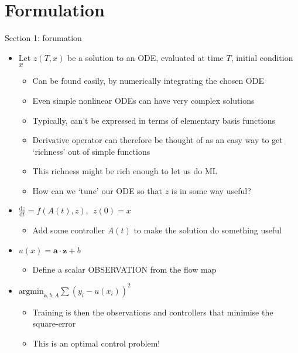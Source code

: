 \documentclass[presentation]{beamer}
\begin{document}
\section{Formulation}
\label{sec:orgaaa8066}
\begin{frame}[label={sec:orgf31cd99},plain]{Section 1: forumation}
\begin{itemize}
\item Let \(z(T,x)\) be a solution to an ODE, evaluated at time \(T\), initial condition \(x\)
\begin{itemize}
\item Can be found easily, by numerically integrating the chosen ODE
\item Even simple nonlinear ODEs can have very complex solutions
\item Typically, can't be expressed in terms of elementary basis functions
\item Derivative operator can therefore be thought of as an easy way to get `richness' out of simple functions
\item This richness might be rich enough to let us do ML
\item \alert{How can we `tune' our ODE so that \(z\) is in some way useful?}
\end{itemize}
\item \(\frac{\mathrm{d}z}{\mathrm{d}t} = f(A(t), z),~~z(0)=x\)
\begin{itemize}
\item Add some controller \(A(t)\) to make the solution do something useful
\end{itemize}
\item \(u(x) = \mathbf{a}\cdot\mathbf{z} + b\)
\begin{itemize}
\item Define a scalar OBSERVATION from the flow map
\end{itemize}
\item \(\mathrm{argmin}_{\mathbf{a},b,A} \sum(y_i - u(x_i))^2\)
\begin{itemize}
\item Training is then the observations and controllers that minimise the square-error
\item This is an optimal control problem!
\end{itemize}
\end{itemize}
\end{frame}
\end{document}
